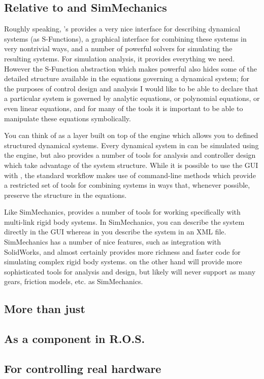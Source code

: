 \subsection{Relative to \simulink and SimMechanics}

Roughly speaking, \matlab's \simunlink provides a very nice interface for describing dynamical systems (as S-Functions), a graphical interface for combining these systems in very nontrivial ways, and a number of powerful solvers for simulating the resulting systems.  For simulation analysis, it provides everything we need.   However the S-Function abstraction which makes \simulink powerful also hides some of the detailed structure available in the equations governing a dynamical system; for the purposes of control design and analysis I would like to be able to declare that a particular system is governed by analytic equations, or polynomial equations, or even linear equations, and for many of the tools it is important to be able to manipulate these equations symbolically.   

You can think of \drake as a layer built on top of the \simulink engine which allows you to defined structured dynamical systems.  Every dynamical system in \drake can be simulated using the \simulink engine, but \drake also provides a number of tools for analysis and controller design which take advantage of the system structure.  While it is possible to use the \simulink GUI with \drake, the standard workflow makes use of command-line methods which provide a restricted set of tools for combining systems in ways that, whenever possible, preserve the structure in the equations.  

Like SimMechanics, \drake provides a number of tools for working specifically with multi-link rigid body systems.  In SimMechanics, you can describe the system directly in the GUI whereas in \drake you describe the system in an XML file.  SimMechanics has a number of nice features, such as integration with SolidWorks, and almost certainly provides more richness and faster code for simulating complex rigid body systems.  \drake on the other hand will provide more sophisticated tools for analysis and design, but likely will never support as many gears, friction models, etc. as SimMechanics.  

\subsection{More than just \matlab}

\subsection{As a component in R.O.S.}

\subsection{For controlling real hardware}

